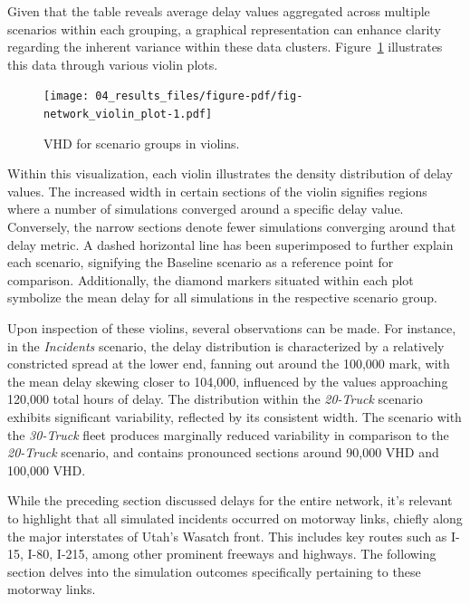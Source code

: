 \documentclass[
  letterpaper,
  authoryear]{elsarticle}
\begin{document}
Given that the table reveals average delay values aggregated across
multiple scenarios within each grouping, a graphical representation can
enhance clarity regarding the inherent variance within these data
clusters. Figure~\ref{fig-network_violin_plot} illustrates this data
through various violin plots.

\begin{figure}

{\centering \texttt{[image: 04\_results\_files/figure-pdf/fig-network\_violin\_plot-1.pdf]}

}

\caption{\label{fig-network_violin_plot}VHD for scenario groups in
violins.}

\end{figure}

Within this visualization, each violin illustrates the density
distribution of delay values. The increased width in certain sections of
the violin signifies regions where a number of simulations converged
around a specific delay value. Conversely, the narrow sections denote
fewer simulations converging around that delay metric. A dashed
horizontal line has been superimposed to further explain each scenario,
signifying the Baseline scenario as a reference point for comparison.
Additionally, the diamond markers situated within each plot symbolize
the mean delay for all simulations in the respective scenario group.

Upon inspection of these violins, several observations can be made. For
instance, in the \emph{Incidents} scenario, the delay distribution is
characterized by a relatively constricted spread at the lower end,
fanning out around the 100,000 mark, with the mean delay skewing closer
to 104,000, influenced by the values approaching 120,000 total hours of
delay. The distribution within the \emph{20-Truck} scenario exhibits
significant variability, reflected by its consistent width. The scenario
with the \emph{30-Truck} fleet produces marginally reduced variability
in comparison to the \emph{20-Truck} scenario, and contains pronounced
sections around 90,000 VHD and 100,000 VHD.

While the preceding section discussed delays for the entire network,
it's relevant to highlight that all simulated incidents occurred on
motorway links, chiefly along the major interstates of Utah's Wasatch
front. This includes key routes such as I-15, I-80, I-215, among other
prominent freeways and highways. The following section delves into the
simulation outcomes specifically pertaining to these motorway links.
\end{document}
